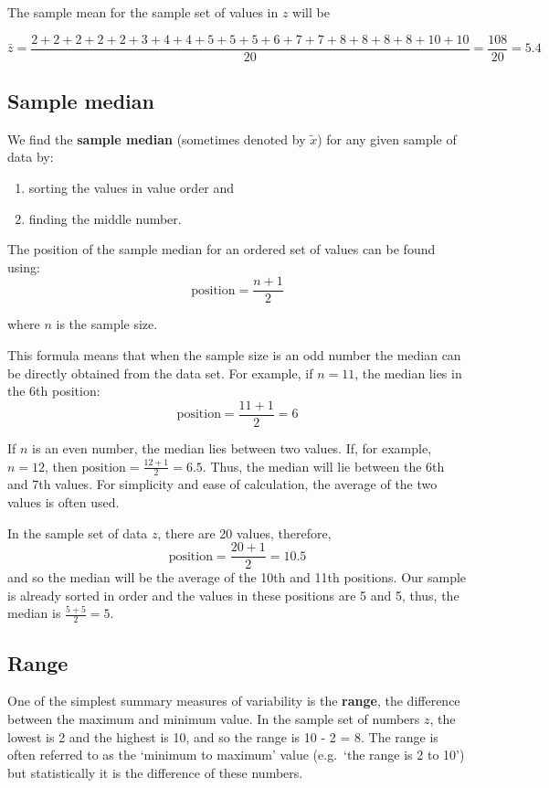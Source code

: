 \documentclass[
  oneside]{krantz}
\begin{document}
The sample mean for the sample set of values in \(z\) will be

\[ \bar z = \frac{2+2+2+2+2+3+4+4+5+5+5+6+7+7+8+8+8+8+10+10}{20} = \frac{108}{20}=5.4\]

\hypertarget{sample-median}{%
\subsection{Sample median}\label{sample-median}}

We find the \textbf{sample median} (sometimes denoted by \(\tilde{x}\)) for any given sample of data by:

\begin{enumerate}
\def\labelenumi{\arabic{enumi}.}
\item
  sorting the values in value order and
\item
  finding the middle number.
\end{enumerate}

The position of the sample median for an ordered set of values can be found using:
\[\textrm{position}=\frac{n+1}{2}\]

where \(n\) is the sample size.

This formula means that when the sample size is an odd number the median can be directly obtained from the data set. For example, if \(n=11\), the median lies in the 6th position:
\[\textrm{position} = \frac{11+1}2=6 \]

If \(n\) is an even number, the median lies between two values. If, for example, \(n=12\), then \(\textrm{position}=\frac{12+1}2=6.5\). Thus, the median will lie between the 6th and 7th values. For simplicity and ease of calculation, the average of the two values is often used.

In the sample set of data \(z\), there are 20 values, therefore, \[\textrm{position}=\frac{20+1}{2}=10.5\]
and so the median will be the average of the 10th and 11th positions. Our sample is already sorted in order and the values in these positions are 5 and 5, thus, the median is \(\frac{5+5}2 = 5\).

\hypertarget{range}{%
\subsection{Range}\label{range}}

One of the simplest summary measures of variability is the \textbf{range}, the difference between the maximum and minimum value. In the sample set of numbers \(z\), the lowest is 2 and the highest is 10, and so the range is 10 - 2 = 8. The range is often referred to as the `minimum to maximum' value (e.g.~`the range is 2 to 10') but statistically it is the difference of these numbers.
\end{document}

